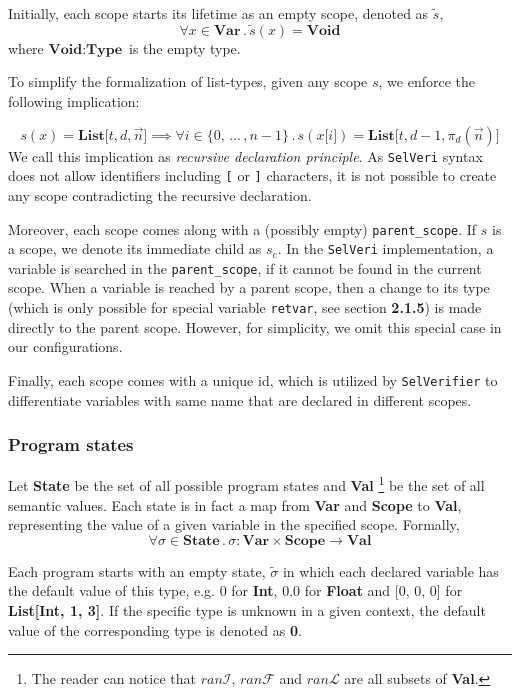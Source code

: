 \documentclass{article}
\begin{document}
Initially, each scope starts its lifetime as an empty scope, denoted as $\tilde{s}$, 
\[
\forall x \in \textbf{Var} \, . \,\tilde{s}(x) = \textbf{Void}
\]
where $\textbf{Void} : \textbf{Type}$ is the empty type.

To simplify the formalization of list-types, given any scope $s$, we enforce the following implication:

\[
s(x) = \textbf{List[$t,d,\vec{n}$]}
\implies
\forall i \in \{0, \,...\, , n-1\} \,.\, s(x\texttt{[$i$]}) = \textbf{List[$t, d-1, \pi_d(\vec{n})$]}
\]
We call this implication as \textit{recursive declaration principle}. As \texttt{SelVeri} syntax does not allow identifiers including \texttt{[} or \texttt{]} characters, it is not possible to create any scope contradicting the recursive declaration.

Moreover, each scope comes along with a (possibly empty) \texttt{parent\_scope}. If $s$ is a scope, we denote its immediate child as $s_c$. In the \texttt{SelVeri} implementation, a variable is searched in the \texttt{parent\_scope}, if it cannot be found in the current scope. When a variable is reached by a parent scope, then a change to its type (which is only possible for special variable \texttt{retvar}, see section \textbf{2.1.5}) is made directly to the parent scope. However, for simplicity, we omit this special case in our configurations.

Finally, each scope comes with a unique id, which is utilized by \texttt{SelVerifier} to differentiate variables with same name that are declared in different scopes.

\newpage
\subsubsection{Program states}

Let \textbf{State} be the set of all possible program states and \textbf{Val} \footnote{The reader can notice that $ran\mathcal{I}$, $ran\mathcal{F}$ and $ran\mathcal{L}$ are all subsets of \textbf{Val}.} be the set of all semantic values. Each state is in fact a map from \textbf{Var} and \textbf{Scope} to \textbf{Val}, representing the value of a given variable in the specified scope. Formally,
\[
\forall \sigma \in \textbf{State} \, . \, \sigma: \textbf{Var} \times \textbf{Scope} \rightarrow \textbf{Val}
\]

Each program starts with an empty state, $\tilde{\sigma}$ in which each declared variable has the default value of this type, e.g. 0 for \textbf{Int}, 0.0 for \textbf{Float} and  [0, 0, 0] for \textbf{List[Int, 1, 3]}. If the specific type is unknown in a given context, the default value of the corresponding type is denoted as \textbf{0}.
\end{document}
